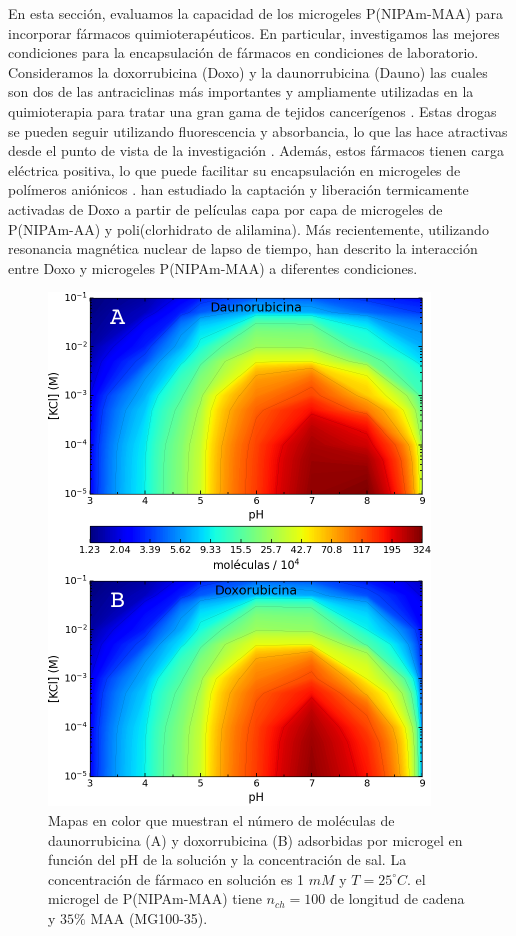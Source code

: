 En esta secci\'on, evaluamos la capacidad de los microgeles P(NIPAm-MAA) para incorporar f\'armacos quimioterap\'euticos. En particular, investigamos las mejores condiciones para la encapsulaci\'on de f\'armacos en condiciones de laboratorio. Consideramos la doxorrubicina (Doxo) y la daunorrubicina (Dauno) las cuales son dos de las antraciclinas m\'as importantes y ampliamente utilizadas en la quimioterapia para tratar una gran gama de tejidos cancer\'igenos \cite{Panis2012, Carvalho2009, aubel1984daunorubicin,come1999dual}. Estas drogas se pueden seguir utilizando fluorescencia y absorbancia, lo que las hace atractivas desde el punto de vista de la investigaci\'on \cite{Serpe2005, ThanHtun2009, perez2020triggering}. Adem\'as, estos f\'armacos tienen carga el\'ectrica positiva, lo que puede facilitar su encapsulaci\'on en microgeles de pol\'imeros ani\'onicos \cite{Li2019}. \citet{Serpe2005} han estudiado la captaci\'on y liberaci\'on termicamente activadas de Doxo a partir de pel\'iculas capa por capa de microgeles de P(NIPAm-AA) y poli(clorhidrato de alilamina). M\'as recientemente, utilizando resonancia magn\'etica nuclear de lapso de tiempo, \citet{MartinezMoro2020} han descrito la interacci\'on entre Doxo y microgeles P(NIPAm-MAA) a diferentes condiciones.
\begin{figure}[!tb]
	\centering
	\includegraphics[width=0.5\linewidth]{Figures/graph-gel/drug_ads.pdf}
	\caption{Mapas en color que muestran el n\'umero de mol\'eculas de daunorrubicina (A) y doxorrubicina (B) adsorbidas por microgel en funci\'on del pH de la soluci\'on y la concentraci\'on de sal.
		La concentraci\'on de f\'armaco en soluci\'on es 1 $mM$ y $T=25 ^\circ C$.
		el microgel de P(NIPAm-MAA) tiene $n_{ch}=100$ de longitud de cadena y $35\%$ MAA (MG100-35).}
	\label{fig:gel:drug_ads}
\end{figure}


